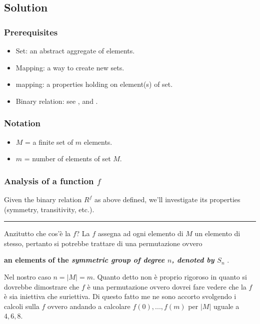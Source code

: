 \documentclass{article}
\begin{document}
\subsection{Solution}

\subsubsection{Prerequisites}
\begin{itemize}
 \item Set: an abstract aggregate of elements.
 \item Mapping: a way to create new sets.
 \item mapping: a properties holding on element(s) of set.
 \item Binary relation: see \cite{herstein1996}, \cite{herstein1999} and \cite{rossi}.
\end{itemize}

\subsubsection{Notation}
\begin{itemize}
 \item $M$ = a finite set of $m$ elements.
 \item $m$ = number of elements of set $M$. 
\end{itemize}


\subsubsection{Analysis of a function $f$}
Given the binary relation $R^f$ as above defined, we'll investigate its properties (symmetry, transitivity, etc.). 

\noindent
{\color{blue} \rule{\linewidth}{0.5mm} }

Anzitutto che cos'\`e la $f$? La $f$ assegna ad ogni elemento di $M$ un elemento di stesso, pertanto si potrebbe trattare di una permutazione ovvero 

\textbf{an elements of the \emph{symmetric group of degree $n$, denoted by $S_n$}} \cite{herstein1999}. 

Nel nostro caso $n=|M|=m$. Quanto detto non \`e proprio rigoroso in quanto si dovrebbe dimostrare che $f$ \`e una permutazione ovvero dovrei fare vedere che la $f$ \`e sia iniettiva che suriettiva. Di questo fatto me ne sono accorto svolgendo i calcoli sulla $f$ ovvero andando a calcolare $f(0),...,f(m)$ per $|M|$ uguale a $4,6,8$. 
\end{document}
